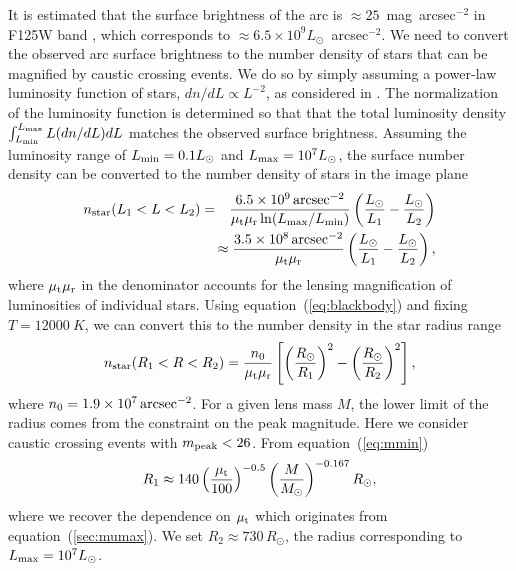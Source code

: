 \documentclass[showpacs,twocolumn,preprintnumbers,amsmath,amssymb,superscriptaddress,nofootinbib]{revtex4}
\begin{document}
It is estimated that the surface brightness of the arc is $\approx
25$~mag~arcsec$^{-2}$ in F125W band \cite{Kelly:2017fps}, which
corresponds to $\approx 6.5 \times 10^9L_\odot$~arcsec$^{-2}$. We need to
convert the observed arc surface brightness to the number density of
stars that can be magnified by caustic crossing events. We do so by
simply assuming a power-law luminosity function of stars,
$dn/dL\propto L^{-2}$, as considered in \cite{Kelly:2017fps}. 
The normalization of the luminosity function is determined so that
that the total luminosity density $\int^{L_{\rm max}}_{L_{\rm
    min}}L(dn/dL)dL$ matches the observed surface brightness. 
Assuming the luminosity range of $L_{\rm min}=0.1L_\odot$ and $L_{\rm
  max}=10^7L_\odot$, the surface number density can be converted to
the number density of stars in the image plane
\begin{eqnarray}
n_{\rm star}(L_1<L<L_2)&= &\frac{6.5 \times 10^9\,{\rm arcsec^{-2}}}{\mu_{\rm t}\mu_{\rm r}\ln(L_{\rm
  max}/L_{\rm
    min})}\left(\frac{L_\odot}{L_1}-\frac{L_\odot}{L_2}\right)\nonumber\\
& & \hspace*{-1.0cm}
\approx \frac{3.5\times 10^8\,{\rm arcsec^{-2}}}{\mu_{\rm t}\mu_{\rm r}}
\left(\frac{L_\odot}{L_1}-\frac{L_\odot}{L_2}\right),
\end{eqnarray}
where $\mu_{\rm t}\mu_{\rm r}$ in the denominator accounts for the
lensing magnification of luminosities of individual stars. Using
equation~(\ref{eq:blackbody}) and fixing $T=12000~K$, we can convert
this to the number density in the star radius range
\begin{equation}
n_{\rm star}(R_1<R<R_2)=\frac{n_0}{\mu_{\rm t}\mu_{\rm r}}
\left[\left(\frac{R_\odot}{R_1}\right)^2-\left(\frac{R_\odot}{R_2}\right)^2\right],
\end{equation}
where $n_0=1.9\times 10^7\,{\rm arcsec^{-2}}$.
For a given lens mass $M$, the lower limit of the radius comes from
the constraint on the peak magnitude. Here we consider caustic crossing
events with $m_{\rm peak}<26$. From equation~(\ref{eq:mmin})
\begin{equation}
R_1\approx 140\left(\frac{\mu_{\rm t}}{100}\right)^{-0.5}
\left(\frac{M}{M_\odot}\right)^{-0.167}R_\odot,
\end{equation}
where we recover the dependence on $\mu_{\rm t}$ which originates from
equation~(\ref{sec:mumax}). We set $R_2\approx 730\,R_\odot$, 
the radius corresponding to $L_{\rm max}=10^7L_\odot$.
\end{document}

